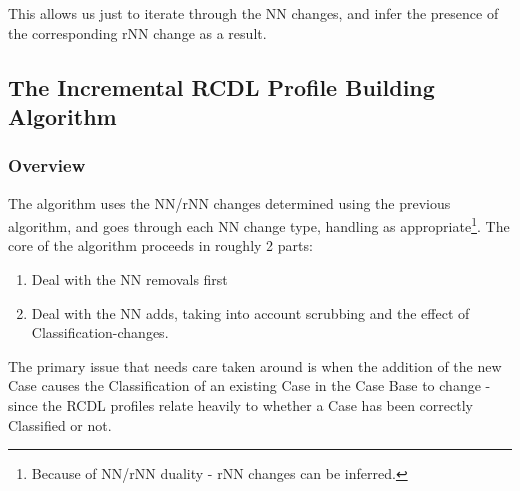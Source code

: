 \documentclass[a4paper,11pt]{report}
\begin{document}
This allows us just to iterate through the NN changes, and infer the presence of the corresponding rNN change as a result.

\subsection{The Incremental RCDL Profile Building Algorithm}
\begin{samepage}
\subsubsection{Overview}
The algorithm uses the NN/rNN changes determined using the previous algorithm, and goes through each NN change type, handling as appropriate\footnote{Because of NN/rNN duality - rNN changes can be inferred.}. The core of the algorithm proceeds in roughly 2 parts:
\begin{enumerate}
	\item Deal with the NN removals first
	\item Deal with the NN adds, taking into account scrubbing and the effect of Classification-changes.
\end{enumerate}

The primary issue that needs care taken around is when the addition of the new Case causes the Classification of an existing Case in the Case Base to change - since the RCDL profiles relate heavily to whether a Case has been correctly Classified or not.


\end{samepage}

\medskip
\end{document}
